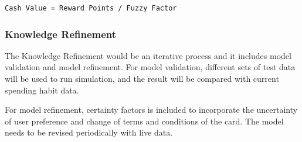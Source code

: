 		\begin{lstlisting}[frame=single, gobble=11, tabsize=4, showstringspaces=false, mathescape]
			Cash Value = Reward Points / Fuzzy Factor
		\end{lstlisting}


	\subsubsection{Knowledge Refinement} %
	\label{ssub:knowledge_refinement}
		The Knowledge Refinement would be an iterative process and it includes model validation and model refinement. For model validation, different sets of test data will be used to run simulation, and the result will be compared with current spending habit data.

		For model refinement, certainty factors is included to incorporate the uncertainty of user preference and change of terms and conditions of the card. The model needs to be revised periodically with live data.


